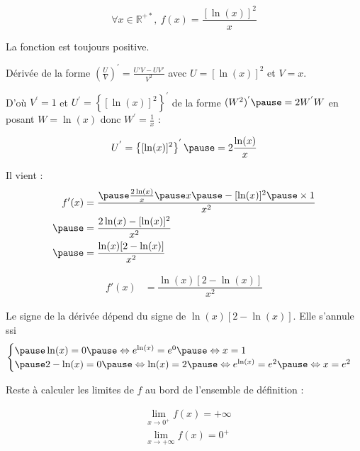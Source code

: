 \documentclass[9pt,handout,professionalfonts,hyperref]{beamer}
\begin{document}
\begin{frame}
$$
\forall x \in \mathbb{R}^{+*}, ~f(x)=\dfrac{[\ln(x)]^2}{x}
$$

\pause La fonction est toujours positive. \newline 

\pause Dérivée de la forme $(\frac{U}{V})^{'}=\frac{U'V-UV'}{V^2}$ \pause avec $U=[\ln(x)]^2$ et $V=x$.\newline  

\pause D'où $V^{'} = 1$ \pause et $U^{'} = \left\{[\ln(x)]^2\right\}^{'}$ \pause de la forme $(W^2)^{'} \pause = 2W^{'}W$ \pause en posant $W=\ln(x)$ \pause donc $W^{'}=\frac{1}{x}$ :

\pause $$U^{'} = \left\{[\ln(x)]^2\right\}^{'} \pause = 2 \frac{\ln(x)}{x}$$

\pause
Il vient :
\[\begin{aligned}
f'(x)
&=\dfrac{\pause \frac{2\ln(x)}{x}\pause x \pause - [\ln(x)]^2 \pause \times 1}{x^2}\\
\pause &=\dfrac{2 \ln(x) -[\ln(x)]^2}{x^2} \\
\pause &=\dfrac{\ln(x) [2-\ln(x)]}{x^2}
\end{aligned}\]

\end{frame}

\begin{frame}

\[\begin{aligned}
f'(x)&=\dfrac{\ln(x) [2-\ln(x)]}{x^2}
\end{aligned}\]

\pause Le signe de la dérivée dépend du signe de $\ln(x) [2-\ln(x)]$. \pause Elle s'annule ssi 
$$\begin{cases} 
\pause \ln(x) =0 \pause \Leftrightarrow e^{\ln(x)} = e^0 \pause \Leftrightarrow  x=1 \\
\pause 2-\ln(x)=0 \pause \Leftrightarrow \ln(x)=2 \pause \Leftrightarrow e^{\ln(x)} = e^2 \pause \Leftrightarrow x=e^2 
\end{cases}$$

\medskip 

Reste à calculer les limites de $f$ au bord de l'ensemble de définition :

\[\begin{aligned}
&\lim_{x \to 0^+} f(x)= +\infty \\
&\lim_{x \to +\infty} f(x)=0^+ 
\end{aligned}\]\\

\end{frame}
\end{document}
